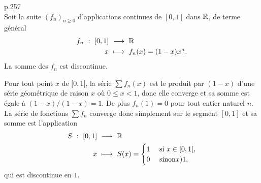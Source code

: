 \begin{prop}
    \cite{contre-exemples} p.257 \\
    Soit la suite $(f_n)_{n \geqslant 0}$ d'applications continues de $[0,1]$ dans $\mathbb{R}$, de terme général
    \begin{alignat*}{2}
        f_n\ :\ [0,1]\ &\longrightarrow\ \mathbb{R}\\
        x\ &\longmapsto\ f_n(x) = (1-x)x^n.
    \end{alignat*}
    La somme des $f_n$ est discontinue.
\end{prop}

\begin{preuve}
    Pour tout point $x$ de $[0,1[$, la série $\sum f_n(x)$ est le produit par $(1-x)$ d'une série géométrique de raison $x$ où $0 \leqslant x < 1$, donc elle converge et sa somme est égale à $(1-x)/(1-x) = 1$. De plus $f_n(1) = 0$ pour tout entier naturel $n$. La série de fonctions $\sum f_n$ converge donc simplement sur le segment $[0,1]$ et sa somme est l'application 
    \begin{alignat*}{2}
        S\ :\ [0,1]\ &\longrightarrow\ \mathbb{R}\\
        x\ &\longmapsto\ S(x) =
        \begin{cases}
            1 &\text{ si } x \in [0,1[,\\
            0 &\text{ sinon} x ) 1,
        \end{cases}
    \end{alignat*}
    qui est discontinue en $1$.
\end{preuve}
